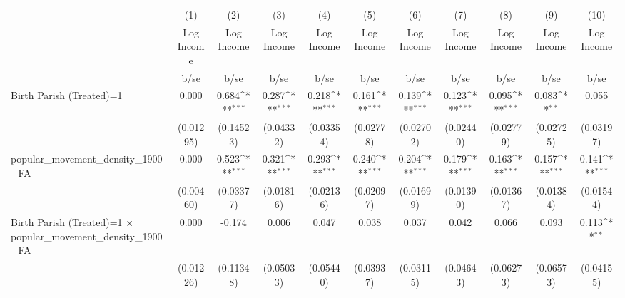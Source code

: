 {
\def\sym#1{\ifmmode^{#1}\else\(^{#1}\)\fi}
\begin{tabular}{l*{10}{c}}
\hline\hline
                    &\multicolumn{1}{c}{(1)}&\multicolumn{1}{c}{(2)}&\multicolumn{1}{c}{(3)}&\multicolumn{1}{c}{(4)}&\multicolumn{1}{c}{(5)}&\multicolumn{1}{c}{(6)}&\multicolumn{1}{c}{(7)}&\multicolumn{1}{c}{(8)}&\multicolumn{1}{c}{(9)}&\multicolumn{1}{c}{(10)}\\
                    &\multicolumn{1}{c}{Log Income}&\multicolumn{1}{c}{Log Income}&\multicolumn{1}{c}{Log Income}&\multicolumn{1}{c}{Log Income}&\multicolumn{1}{c}{Log Income}&\multicolumn{1}{c}{Log Income}&\multicolumn{1}{c}{Log Income}&\multicolumn{1}{c}{Log Income}&\multicolumn{1}{c}{Log Income}&\multicolumn{1}{c}{Log Income}\\
                    &        b/se         &        b/se         &        b/se         &        b/se         &        b/se         &        b/se         &        b/se         &        b/se         &        b/se         &        b/se         \\
\hline
Birth Parish (Treated)=1&       0.000         &       0.684\sym{***}&       0.287\sym{***}&       0.218\sym{***}&       0.161\sym{***}&       0.139\sym{***}&       0.123\sym{***}&       0.095\sym{***}&       0.083\sym{**} &       0.055         \\
                    &   (0.01295)         &   (0.14523)         &   (0.04332)         &   (0.03354)         &   (0.02778)         &   (0.02702)         &   (0.02440)         &   (0.02779)         &   (0.02725)         &   (0.03197)         \\
popular\_movement\_density\_1900\_FA&       0.000         &       0.523\sym{***}&       0.321\sym{***}&       0.293\sym{***}&       0.240\sym{***}&       0.204\sym{***}&       0.179\sym{***}&       0.163\sym{***}&       0.157\sym{***}&       0.141\sym{***}\\
                    &   (0.00460)         &   (0.03377)         &   (0.01816)         &   (0.02136)         &   (0.02097)         &   (0.01699)         &   (0.01390)         &   (0.01367)         &   (0.01384)         &   (0.01544)         \\
Birth Parish (Treated)=1 $\times$ popular\_movement\_density\_1900\_FA&       0.000         &      -0.174         &       0.006         &       0.047         &       0.038         &       0.037         &       0.042         &       0.066         &       0.093         &       0.113\sym{**} \\
                    &   (0.01226)         &   (0.11348)         &   (0.05033)         &   (0.05440)         &   (0.03937)         &   (0.03115)         &   (0.04643)         &   (0.06273)         &   (0.06573)         &   (0.04155)         \\

\end{tabular}}
